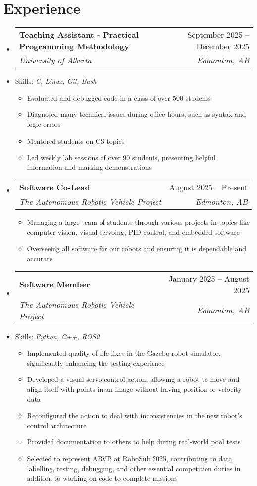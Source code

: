 \documentclass[letterpaper,11pt]{article}
\makeatletter
\newcommand{\resumeItem}[1]{
  \item\small{
    {#1 \vspace{-2pt}}
  }
}
\newcommand{\resumeSubheading}[4]{
  \vspace{-2pt}\item
    \begin{tabular*}{0.97\textwidth}[t]{l@{\extracolsep{\fill}}r}
      \textbf{#1} & #2 \\
      \textit{\small#3} & \textit{\small #4} \\
    \end{tabular*}\vspace{-7pt}
}
\newcommand{\resumeSubSubheading}[2]{
    \item
    \begin{tabular*}{0.97\textwidth}{l@{\extracolsep{\fill}}r}
      \textit{\small#1} & \textit{\small #2} \\
    \end{tabular*}\vspace{-7pt}
}
\newcommand{\resumeSubItem}[1]{\resumeItem{#1}\vspace{-4pt}}
\newcommand{\resumeSubHeadingListStart}{\begin{itemize}[leftmargin=0.15in, label={}]}
\newcommand{\resumeSubHeadingListEnd}{\end{itemize}}
\newcommand{\resumeItemListStart}{\begin{itemize}}
\newcommand{\resumeItemListEnd}{\end{itemize}\vspace{-5pt}}
\makeatother
\begin{document}
\section{Experience}	
  \resumeSubHeadingListStart
  	 \resumeSubheading
      {Teaching Assistant - Practical Programming Methodology}{September 2025 -- December 2025}
      {University of Alberta}{Edmonton, AB}
      \resumeSubItem{Skills: \emph{C, Linux, Git, Bash}}
      \resumeItemListStart
        \resumeItem{Evaluated and debugged code in a class of over 500 students}
        \resumeItem{Diagnosed many technical issues during office hours, such as syntax and logic errors}
        \resumeItem{Mentored students on CS topics}
        \resumeItem{Led weekly lab sessions of over 90 students, presenting helpful information and marking demonstrations}
      \resumeItemListEnd
  	\resumeSubheading
      {Software Co-Lead}{August 2025 -- Present}
      {The Autonomous Robotic Vehicle Project}{Edmonton, AB}
      \resumeItemListStart
        \resumeItem{Managing a large team of students through various projects in topics like computer vision, visual servoing, PID control, and embedded software}
        \resumeItem{Overseeing all software for our robots and ensuring it is dependable and accurate}
      \resumeItemListEnd
    \resumeSubheading
      {Software Member}{January 2025 -- August 2025}
      {The Autonomous Robotic Vehicle Project}{Edmonton, AB}
     \resumeSubItem{Skills: \emph{Python, C++, ROS2}}
      \resumeItemListStart
        \resumeItem{Implemented quality-of-life fixes in the Gazebo robot simulator, significantly enhancing the testing experience}
        \resumeItem{Developed a visual servo control action, allowing a robot to move and align itself with points in an image without having position or velocity data}
        \resumeItem{Reconfigured the action to deal with inconsistencies in the new robot's control architecture}
        \resumeItem{Provided documentation to others to help during real-world pool tests}
        \resumeItem{Selected to represent ARVP at RoboSub 2025, contributing to data labelling, testing, debugging, and other essential competition duties in addition to working on code to complete missions}
      \resumeItemListEnd
      

  \resumeSubHeadingListEnd

\end{document}
